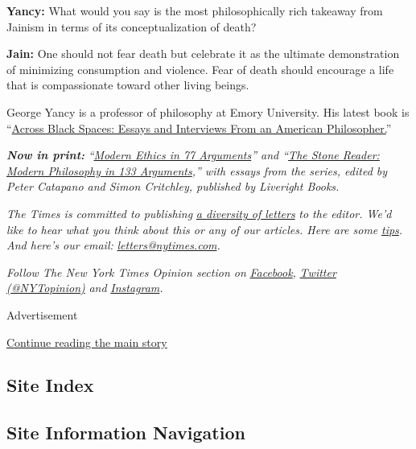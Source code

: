 \textbf{Yancy:} What would you say is the most philosophically rich
takeaway from Jainism in terms of its conceptualization of death?

\textbf{Jain:} One should not fear death but celebrate it as the
ultimate demonstration of minimizing consumption and violence. Fear of
death should encourage a life that is compassionate toward other living
beings.

George Yancy is a professor of philosophy at Emory University. His
latest book is
``\href{https://rowman.com/ISBN/9781538131619/Across-Black-Spaces-Essays-and-Interviews-from-an-American-Philosopher}{Across
Black Spaces: Essays and Interviews From an American Philosopher.}''

\emph{\textbf{Now in print:}}
\emph{``}\href{http://bitly.com/1MW2kN3}{\emph{Modern Ethics in 77
Arguments}}\emph{'' and ``}\href{http://bitly.com/1MW2kN3}{\emph{The
Stone Reader: Modern Philosophy in 133 Arguments}}\emph{,'' with essays
from the series, edited by Peter Catapano and Simon Critchley, published
by Liveright Books.}

\emph{The Times is committed to publishing}
\href{https://www.nytimes.com/2019/01/31/opinion/letters/letters-to-editor-new-york-times-women.html}{\emph{a
diversity of letters}} \emph{to the editor. We'd like to hear what you
think about this or any of our articles. Here are some}
\href{https://help.nytimes.com/hc/en-us/articles/115014925288-How-to-submit-a-letter-to-the-editor}{\emph{tips}}\emph{.
And here's our email:}
\href{mailto:letters@nytimes.com}{\emph{letters@nytimes.com}}\emph{.}

\emph{Follow The New York Times Opinion section on}
\href{https://www.facebook.com/nytopinion}{\emph{Facebook}}\emph{,}
\href{http://twitter.com/NYTOpinion}{\emph{Twitter (@NYTopinion)}}
\emph{and}
\href{https://www.instagram.com/nytopinion/}{\emph{Instagram}}\emph{.}

Advertisement

\protect\hyperlink{after-bottom}{Continue reading the main story}

\hypertarget{site-index}{%
\subsection{Site Index}\label{site-index}}

\hypertarget{site-information-navigation}{%
\subsection{Site Information
Navigation}\label{site-information-navigation}}

